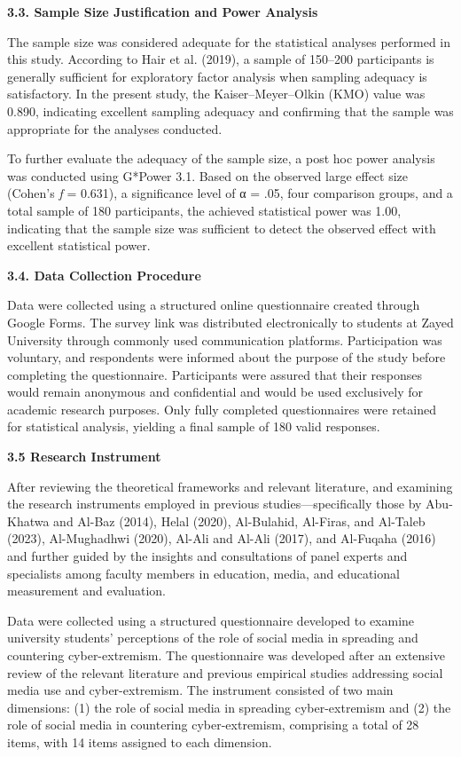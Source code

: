\documentclass[11pt,a4paper]{article}
\begin{document}
	\textbf{3.3. Sample Size Justification and Power Analysis}
	
	The sample size was considered adequate for the statistical analyses performed in this study. According to Hair et al. (2019), a sample of 150--200 participants is generally sufficient for exploratory factor analysis when sampling adequacy is satisfactory. In the present study, the Kaiser--Meyer--Olkin (KMO) value was 0.890, indicating excellent sampling adequacy and confirming that the sample was appropriate for the analyses conducted.
	
	To further evaluate the adequacy of the sample size, a post hoc power analysis was conducted using G*Power 3.1. Based on the observed large effect size (Cohen's \textit{f} = 0.631), a significance level of α = .05, four comparison groups, and a total sample of 180 participants, the achieved statistical power was 1.00, indicating that the sample size was sufficient to detect the observed effect with excellent statistical power.
	
	\textbf{3.4. Data Collection Procedure}
	
	Data were collected using a structured online questionnaire created through Google Forms. The survey link was distributed electronically to students at Zayed University through commonly used communication platforms. Participation was voluntary, and respondents were informed about the purpose of the study before completing the questionnaire. Participants were assured that their responses would remain anonymous and confidential and would be used exclusively for academic research purposes. Only fully completed questionnaires were retained for statistical analysis, yielding a final sample of 180 valid responses.
	
	\textbf{3.5 Research Instrument}
	
	After reviewing the theoretical frameworks and relevant literature, and examining the research instruments employed in previous studies---specifically those by Abu-Khatwa and Al-Baz (2014), Helal (2020), Al-Bulahid, Al-Firas, and Al-Taleb (2023), Al-Mughadhwi (2020), Al-Ali and Al-Ali (2017), and Al-Fuqaha (2016) and further guided by the insights and consultations of panel experts and specialists among faculty members in education, media, and educational measurement and evaluation.
	
	Data were collected using a structured questionnaire developed to examine university students' perceptions of the role of social media in spreading and countering cyber-extremism. The questionnaire was developed after an extensive review of the relevant literature and previous empirical studies addressing social media use and cyber-extremism. The instrument consisted of two main dimensions: (1) the role of social media in spreading cyber-extremism and (2) the role of social media in countering cyber-extremism, comprising a total of 28 items, with 14 items assigned to each dimension.
	
\end{document}

